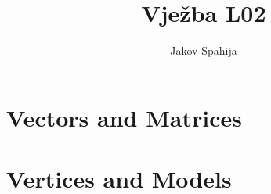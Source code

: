
\usepackage{mathtools}
\usepackage{amssymb}

\newcommand{\basedir}{~/FESB/2. semestar/3D Simulacije/Izvještaji/vjezba3}
\title{Vježba L02}
\author{Jakov Spahija}


\maketitle
\vspace{15em}
\tableofcontents
\pagebreak

\section{Vectors and Matrices}
\label{sec:vecmat}
\setcounter{lstlisting}{0}

\begin{codelisting}
	
\end{codelisting}

\pagebreak

\begin{codelisting}
	
\end{codelisting}

\begin{codelisting}
	}]{\basedir/Vectors and Matrices/Matrix4x4.h}
\end{codelisting}

\pagebreak

\begin{codelisting}
	
\end{codelisting}

\begin{codesection}
	
\end{codesection}

\pagebreak
\section{Vertices and Models}
\label{sec:vertmod}
\setcounter{lstlisting}{0}

